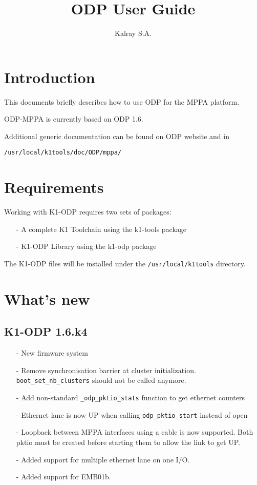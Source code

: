 \documentclass{trkalray}
\author{%
Kalray S.A.\autref{1}
}
\institute{%
\autlabel{1} \email{support@kalray.eu},
Kalray S.A.
}
\title{\MPPA ODP User Guide}
\begin{document}
\maketitle

\tableofcontents

\newpage
\section{Introduction}

This documents briefly describes how to use ODP for the MPPA platform.

ODP-MPPA is currently based on ODP 1.6.

Additional generic documentation can be found on ODP website and in
\begin{lstlisting}
/usr/local/k1tools/doc/ODP/mppa/
\end{lstlisting}

\section{Requirements}

Working with K1-ODP requires two sets of packages:
\begin{itemize}
\item[-]{A complete K1 Toolchain using the k1-tools package}
\item[-]{K1-ODP Library using the k1-odp package}
\end{itemize}

The K1-ODP files will be installed under the
\texttt{/usr/local/k1tools} directory.

\section{What's new}
\subsection{K1-ODP 1.6.k4}
\begin{itemize}
\item[-]{New firmware system}
\item[-]{Remove synchronisation barrier at cluster
  initialization. \texttt{boot\_set\_nb\_clusters} should not be
  called anymore.}
\item[-]{Add non-standard \texttt{\_odp\_pktio\_stats} function to get
ethernet counters}
\item[-]{Ethernet lane is now UP when calling
  \texttt{odp\_pktio\_start} instead of open}
\item[-]{Loopback between MPPA interfaces using a cable is now
  supported. Both pktio must be created before starting them to allow
  the link to get UP.}
\item[-]{Added support for multiple ethernet lane on one I/O.}
\item[-]{Added support for EMB01b.}
\end{itemize}
\end{document}
